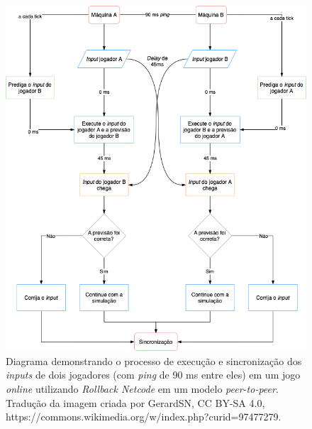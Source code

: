 \begin{figure}[htbp]
\centering
\includegraphics[width=1\textwidth]{images/rollback.png}
\caption{Diagrama demonstrando o processo de execução e sincronização dos \textit{inputs} de dois jogadores (com \textit{ping} de 90 ms entre eles) em um jogo \textit{online} utilizando \textit{Rollback Netcode} em um modelo \textit{peer-to-peer}. Tradução da imagem criada por GerardSN, CC BY-SA 4.0, https://commons.wikimedia.org/w/index.php?curid=97477279.}
\label{fig:rollback_diagram}
\end{figure}
